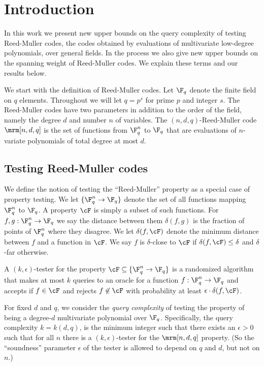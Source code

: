 \section{Introduction}

In this work we present new upper bounds on the query complexity of testing
Reed-Muller codes, the codes obtained by evaluations of multivariate 
low-degree polynomials, over general fields. In the process we also 
give new upper
bounds on the spanning weight of Reed-Muller codes. We explain
these terms and our results below.

We start with the definition of Reed-Muller codes. Let $\F_q$ denote
the finite field on $q$ elements. Throughout we will let $q = p^s$ for
prime $p$ and integer $s$. The Reed-Muller codes have two parameters
in addition to the 
%
order of the field,   %
namely the degree $d$ and 
%
number $n$ of variables.  %
The $(n,d,q)$-Reed-Muller code $\mrm[n,d,q]$ is the
set of functions from $\F_q^n$ to $\F_q$ that are evaluations of
$n$-variate polynomials of total degree at most $d$.

\subsection{Testing Reed-Muller codes}

We define the notion of testing the ``Reed-Muller'' property as
a special case of property testing.
We let $\{\F_q^n \to \F_q\}$ denote the set of all functions
mapping $\F_q^n$ to $\F_q$. A property $\cF$ is simply a subset
of such functions. For $f,g : \F_q^n \to \F_q$ we say
the distance between them $\delta(f,g)$ is the fraction of
points of $\F_q^n$ where they disagree.
We let $\delta(f,\cF)$ denote the minimum distance between $f$ and
a function in $\cF$. We say $f$ is $\delta$-close
to $\cF$ if $\delta(f,\cF)\leq \delta$
and $\delta$-far otherwise.

A $(k,\epsilon)$-tester for the property $\cF \subseteq \{\F_q^n \to
\F_q\}$ is a randomized algorithm that makes at most $k$ queries to
an oracle for a function $f:\F_q^n \to \F_q$ and accepts if $f \in
\cF$ and rejects $f \not\in \cF$ with probability at least
$\epsilon \cdot \delta(f,\cF)$.

For fixed $d$ and $q$, we consider the \emph{query complexity} of
testing the property of being a %
degree-$d$ %
multivariate polynomial over $\F_q$.
Specifically, the query complexity $k = k(d,q)$, is the minimum
integer such that there exists an $\epsilon >0$ such that for all $n$
there is a $(k,\epsilon)$-tester for the $\mrm[n,d,q]$ property.
(So the ``soundness'' parameter $\epsilon$ of the tester is allowed to depend on $q$ and $d$, but
not on $n$.)

